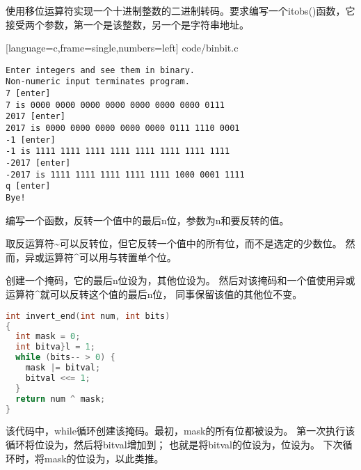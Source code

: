 \begin{frame}[fragile]
  \begin{li}
    使用移位运算符实现一个十进制整数的二进制转码。要求编写一个{\tf itobs()}函数，它接受两个参数，第一个是该整数，另一个是字符串地址。
  \end{li}

\end{frame}

\begin{frame}
  
  [language=c,frame=single,numbers=left]
  {code/binbit.c}
\end{frame}

\begin{frame}[fragile]
\begin{lstlisting}[backgroundcolor=\color{red!20}]
Enter integers and see them in binary.
Non-numeric input terminates program.
7 [enter]
7 is 0000 0000 0000 0000 0000 0000 0000 0111
2017 [enter]
2017 is 0000 0000 0000 0000 0000 0111 1110 0001
-1 [enter]
-1 is 1111 1111 1111 1111 1111 1111 1111 1111
-2017 [enter]
-2017 is 1111 1111 1111 1111 1111 1000 0001 1111
q [enter]
Bye!
\end{lstlisting}
\end{frame}

\begin{frame}[fragile]
  \begin{li}
    编写一个函数，反转一个值中的最后{\tf n}位，参数为{\tf n}和要反转的值。
  \end{li}

\end{frame}

\begin{frame}[fragile]  
  取反运算符{\tf \~{}}可以反转位，但它反转一个值中的所有位，而不是选定的少数位。
  然而，异或运算符{\tf \^{}}可以用与转置单个位。

  \pause \vspace{.1in}
  创建一个掩码，它的最后{\tf n}位设为{}，其他位设为{}。
  然后对该掩码和一个值使用异或运算符{\tf \^{}}就可以反转这个值的最后{\tf n}位，
  同事保留该值的其他位不变。
\end{frame}

\begin{frame}
\begin{lstlisting}[language=c,backgroundcolor=\color{red!20}]
int invert_end(int num, int bits)
{
  int mask = 0;
  int bitva}l = 1;
  while (bits-- > 0) {
    mask |= bitval;
    bitval <<= 1;
  }
  return num ^ mask;
}
\end{lstlisting}
该代码中，{\tf while}循环创建该掩码。最初，{\tf mask}的所有位都被设为{}。
第一次执行该循环将位{}设为{}，然后将{\tf bitval}增加到{}；
也就是将{\tf bitval}的位{}设为{}，位{}设为{}。
下次循环时，将{\tf mask}的位{}设为{}，以此类推。
\end{frame}

